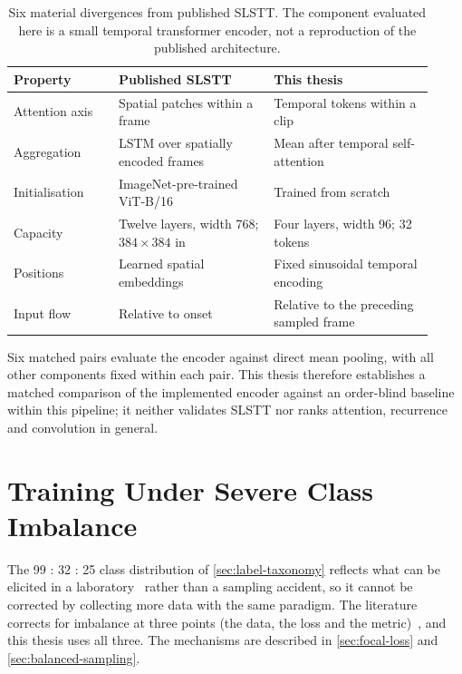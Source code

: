 \begin{table}[htbp]
	\centering
	\small
	\begin{tabular}{@{}p{0.23\linewidth} p{0.34\linewidth} p{0.35\linewidth}@{}}
		\hline
		\textbf{Property} & \textbf{Published SLSTT~\cite{zhang2022}} & \textbf{This thesis} \\
		\hline
		Attention axis   & Spatial patches within a frame              & Temporal tokens within a clip \\
		Aggregation      & LSTM over spatially encoded frames          & Mean after temporal self-attention \\
		Initialisation   & ImageNet-pre-trained ViT-B/16               & Trained from scratch \\
		Capacity         & Twelve layers, width 768; $384\times384$ in & Four layers, width 96; 32 tokens \\
		Positions        & Learned spatial embeddings                  & Fixed sinusoidal temporal encoding \\
		Input flow       & Relative to onset                           & Relative to the preceding sampled frame \\
		\hline
	\end{tabular}
	\caption[Divergences from published SLSTT]{Six material divergences from published SLSTT. The component evaluated here is a small temporal transformer encoder, not a reproduction of the published architecture.}
	\label{tab:slstt-divergences}
\end{table}

Six matched pairs evaluate the encoder against direct mean pooling, with all other components fixed within each pair. This thesis therefore establishes a matched comparison of the implemented encoder against an order-blind baseline within this pipeline; it neither validates SLSTT nor ranks attention, recurrence and convolution in general.


\section{Training Under Severe Class Imbalance}
\label{sec:imbalance-review}

The 99 : 32 : 25 class distribution of \autoref{sec:label-taxonomy} reflects what can be elicited in a laboratory~\cite{yan2014} rather than a sampling accident, so it cannot be corrected by collecting more data with the same paradigm. The literature corrects for imbalance at three points (the data, the loss and the metric)~\cite{he2009,zhaoS2021,see2019}, and this thesis uses all three. The mechanisms are described in \autoref{sec:focal-loss} and \autoref{sec:balanced-sampling}.


